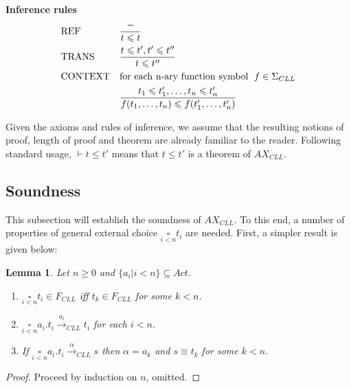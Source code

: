 \documentclass{elsarticle}
\theoremstyle{plain}
\newtheorem{lemma}[theorem]{Lemma}
\theoremstyle{definition}
\begin{document}
\noindent \textbf{Inference rules}
    \begin{align*}\hfill
    &\text{REF}  &       &\frac{-}{t\leqslant t}  \\
    &\text{TRANS}  &    &\frac{t\leqslant t',t'\leqslant t''}{t\leqslant t''}  \\
    &\text{CONTEXT}  &     & \text{for each n-ary function symbol } \;f \in \Sigma_{CLL}\\
    & & & \frac{t_1 \leqslant t_1',\dots, t_n \leqslant t_n'}{f(t_1, \dots, t_n) \leqslant f(t_1',\dots,t_n')}
    \end{align*}

Given the axioms and rules of inference, we assume that the resulting notions of proof, length of proof and theorem are already familiar to the reader. Following standard usage, $\vdash t \leqslant t'$ means that $t \leqslant t'$ is a theorem of $AX_{CLL}$.

\subsection{Soundness}
This subsection will establish the soundness of $AX_{CLL}$. To this end, a number of properties of general external choice $\underset{i<n}\square t_i$ are needed. First, a simpler result is given below:

\begin{lemma}\label{L:BIG_SQUARE}
Let $n\geq 0$ and $\{a_i | i<n \}\subseteq Act$.
\begin{enumerate}
  \item $ \underset{i<n}\square t_i \in F_{CLL}$ iff $t_k\in F_{CLL}$ for some $k<n$.
  \item  $\underset{i<n}\square a_i.t_i \stackrel{a_i}{\longrightarrow}_{CLL} t_i$ for each $i<n$.
  \item If $\underset{i<n}\square a_i.t_i \stackrel{\alpha}{\longrightarrow}_{CLL} s$ then $\alpha = a_k$ and $s \equiv t_k$ for some $k<n$.
\end{enumerate}
\end{lemma}
\begin{proof}
  Proceed by induction on $n$, omitted.
\end{proof}
\end{document}
